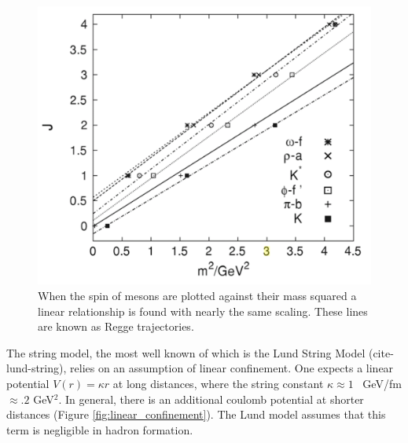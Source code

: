 \begin{figure}
\begin{center}
\includegraphics[width=.55\textwidth]{pics/regge_trajectories}
\end{center}
\caption{When the spin  of mesons are plotted against their mass squared a linear relationship is found with nearly the same scaling. These lines are
known as Regge trajectories.  }
\label{fig:regge}
\end{figure}

The string model, the most well known of which is the Lund String Model (cite-lund-string), relies on an assumption of linear confinement. One expects
a linear potential $V(r) = \kappa r$ at long distances, where the string constant $\kappa \approx 1$~ GeV/fm $\approx .2$ GeV$^2$. In general, 
there is an additional coulomb potential at shorter distances (Figure \ref{fig:linear_confinement}). The Lund model assumes that this term is negligible
in hadron formation. 

